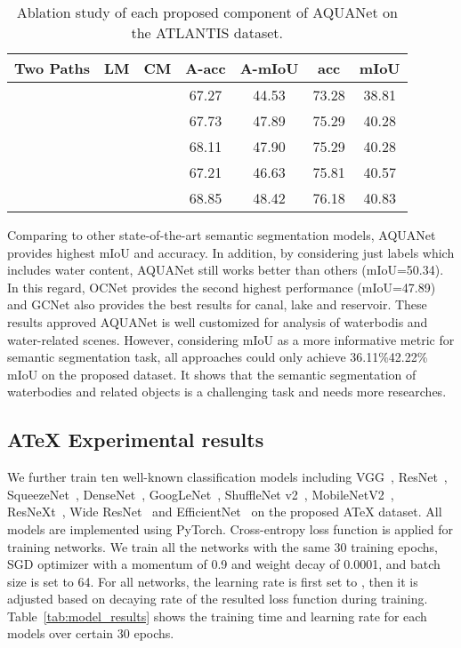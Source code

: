 \documentclass{article}
\begin{document}
\begin{table}[h]
	\centering
	\caption{Ablation study of each proposed component of AQUANet on the ATLANTIS dataset.}
\renewcommand\arraystretch{1.0}
{\begin{tabular}{ccc|cccc}
			\toprule
			Two Paths & LM & CM &A-acc &A-mIoU & acc & mIoU  \\
			\midrule
			 & & & 67.27 & 44.53 &73.28 &38.81 \\
			 & & & 67.73 & 47.89 & 75.29 &40.28\\
			 & & & 68.11 & 47.90 &75.29 &40.28\\
			 & & & 67.21 &46.63 &75.81 &40.57  \\
			 & & & 68.85 & 48.42 & 76.18 &40.83 \\
			\bottomrule

	\end{tabular}}
	\label{tab:ablation}
\end{table}

Comparing to other state-of-the-art semantic segmentation models, AQUANet provides highest mIoU and accuracy. In addition, by considering just labels which includes water content, AQUANet still works better than others (mIoU=50.34). In this regard, OCNet provides the second highest performance (mIoU=47.89) and GCNet also provides the best results for canal, lake and reservoir. These results approved AQUANet is well customized for analysis of waterbodis and water-related scenes. However, considering mIoU as a more informative metric for semantic segmentation task, all approaches could only achieve 36.11\%42.22\% mIoU on the proposed dataset. It shows that the semantic segmentation of waterbodies and related objects is a challenging task and needs more researches.

\subsection{ATeX Experimental results}
We further train ten well-known classification models including VGG~\cite{simonyan2014very}, ResNet~\cite{he2016deep}, SqueezeNet~\cite{iandola2016squeezenet}, DenseNet~\cite{huang2017densely}, GoogLeNet~\cite{szegedy2015going}, ShuffleNet v2~\cite{ma2018shufflenet}, MobileNetV2~\cite{sandler2018mobilenetv2}, ResNeXt~\cite{xie2017aggregated}, Wide ResNet~\cite{zagoruyko2016wide} and EfficientNet~\cite{tan2019efficientnet} on the proposed ATeX dataset. All models are implemented using PyTorch. Cross-entropy loss function is applied for training networks. We train all the networks with the same 30 training epochs, SGD optimizer with a momentum of 0.9 and weight decay of 0.0001, and batch size is set to 64. For all networks, the learning rate is first set to , then it is adjusted based on decaying rate of the resulted loss function during training. Table~\ref{tab:model_results} shows the training time and learning rate for each models over certain 30 epochs.
\end{document}
